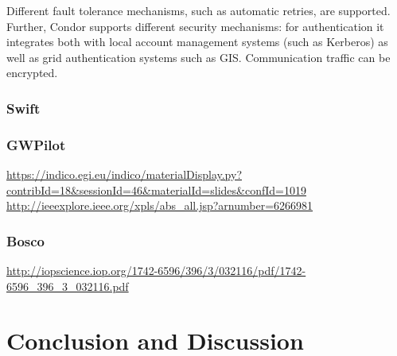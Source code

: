 \documentclass{sig-alternate}
\begin{document}
Different fault tolerance mechanisms, such as automatic retries, are
supported.  Further, Condor supports different security mechanisms:
for authentication it integrates both with local account management
systems (such as Kerberos) as well as grid authentication systems such
as GIS. Communication traffic can be encrypted.

\subsubsection{Swift}

\subsubsection{GWPilot}
\url{https://indico.egi.eu/indico/materialDisplay.py?contribId=18&sessionId=46&materialId=slides&confId=1019}
\\
\url{http://ieeexplore.ieee.org/xpls/abs_all.jsp?arnumber=6266981}

\subsubsection{Bosco}
\url{http://iopscience.iop.org/1742-6596/396/3/032116/pdf/1742-6596_396_3_032116.pdf}

% 


\section{Conclusion and Discussion}
\end{document}
